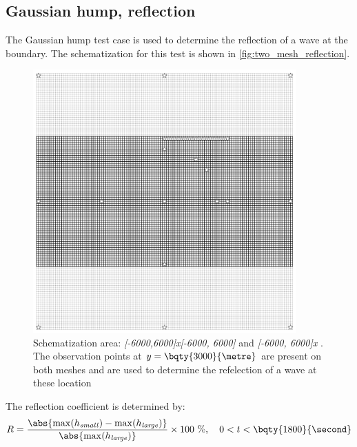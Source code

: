 \subsection{Gaussian hump, reflection}\label{sec:gaussian_hump_refelction}
The Gaussian hump test case is used to determine the reflection of a wave at the boundary. The schematization for this test is shown in \autoref{fig:two_mesh_reflection}.
\begin{figure}[H]
    \centering
    \includegraphics[width=0.9\textwidth]{figures/two_meshes_for_reflection.png}
    \caption{Schematization area: \emph{[-6000,6000]x[-6000, 6000]}  and \emph{[-6000, 6000]x\newline [-3000, 3000]} \bunit{\metre}. The observation points at $y=\bqty{3000}{\metre}$ are present on both meshes and are used to determine the refelection of a wave at these location}\label{fig:two_mesh_reflection}
\end{figure}

The reflection coefficient is determined by:
\begin{align}
    R = \frac{  \abs{\max(h_{\it small}) - \max(h_{\it large})}}{\abs{\max(h_{\it large})} } \times 100\ \%, \quad 0 < t < \bqty{1800}{\second}
\end{align}
\notyet